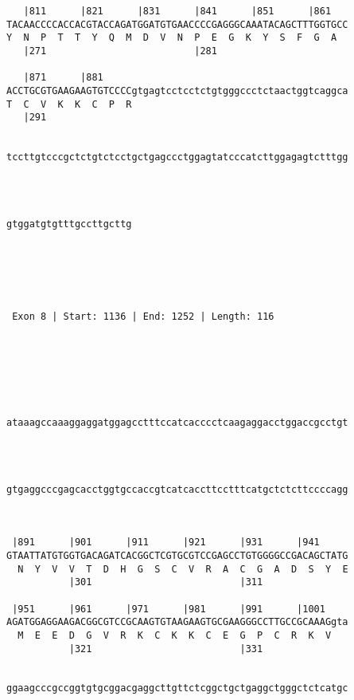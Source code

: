 \documentclass{article}
\begin{document}
\begin{Verbatim}
   |811      |821      |831      |841      |851      |861   
TACAACCCCACCACGTACCAGATGGATGTGAACCCCGAGGGCAAATACAGCTTTGGTGCC
Y  N  P  T  T  Y  Q  M  D  V  N  P  E  G  K  Y  S  F  G  A  
   |271                          |281                       
   
   |871      |881                                           
ACCTGCGTGAAGAAGTGTCCCCgtgagtcctcctctgtgggccctctaactggtcaggca
T  C  V  K  K  C  P  R                                      
   |291                                                     
   
                                                            
tccttgtcccgctctgtctcctgctgagccctggagtatcccatcttggagagtctttgg
                                                            
                                                            
   
                      
gtggatgtgtttgccttgcttg
                      
                      
  



 Exon 8 | Start: 1136 | End: 1252 | Length: 116 





   
                                                            
ataaagccaaaggaggatggagcctttccatcacccctcaagaggacctggaccgcctgt
                                                            
                                                            
   
                                                            
gtgaggcccgagcacctggtgccaccgtcatcaccttcctttcatgctctcttccccagg
                                                            
                                                            
   
 |891      |901      |911      |921      |931      |941     
GTAATTATGTGGTGACAGATCACGGCTCGTGCGTCCGAGCCTGTGGGGCCGACAGCTATG
  N  Y  V  V  T  D  H  G  S  C  V  R  A  C  G  A  D  S  Y  E
           |301                          |311               
   
 |951      |961      |971      |981      |991      |1001    
AGATGGAGGAAGACGGCGTCCGCAAGTGTAAGAAGTGCGAAGGGCCTTGCCGCAAAGgta
  M  E  E  D  G  V  R  K  C  K  K  C  E  G  P  C  R  K  V   
           |321                          |331               
   
                                                            
ggaagcccgccggtgtgcggacgaggcttgttctcggctgctgaggctgggctctcatgc
                                                            

\end{Verbatim}
\end{document}
